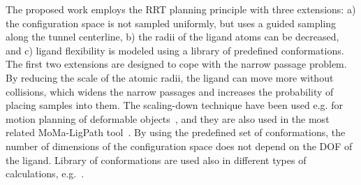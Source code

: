 \documentclass[letterpaper, 10 pt, conference]{ieeeconf} %
\begin{document}

The proposed work employs the RRT planning principle with three extensions: 
a) the configuration space is not sampled uniformly, but uses a guided sampling along the tunnel centerline,
b) the radii of the ligand atoms can be decreased, and 
c) ligand flexibility is modeled using a library of predefined conformations.
The first two extensions are designed to cope with the narrow passage problem.
By reducing the scale of the atomic radii, the ligand can move more without collisions, which widens the narrow passages and increases
the probability of placing samples into them.
The scaling-down technique have been used e.g. for motion planning of deformable objects~\cite{gayle2005path,alterovitz2008motion}, and
they are also used in the most related MoMa-LigPath tool~\cite{cortes2005path}.
By using the predefined set of conformations, the number of dimensions of the configuration space does not depend on the DOF of the ligand.
Library of conformations are used also in different types of calculations, e.g.~\cite{kellogg}. 



\end{document}
